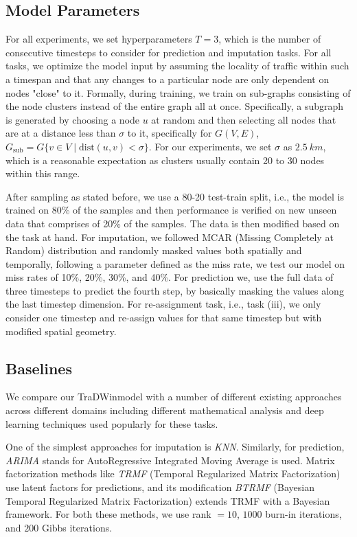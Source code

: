 \documentclass[conference]{IEEEtran}
\newcommand{\name}{TraDWin}
\begin{document}
\subsection{Model Parameters}

For all experiments, we set hyperparameters $T = 3$, which is the number of consecutive timesteps to consider for prediction and imputation tasks. For all tasks, we optimize the model input by assuming the locality of traffic within such a timespan and that any changes to a particular node are only dependent on nodes "close" to it. Formally, during training, we train on sub-graphs consisting of the node clusters instead of the entire graph all at once. Specifically, a subgraph is generated by choosing a node $u$ at random and then selecting all nodes that are at a distance less than $\sigma$ to it, specifically for $G(V,E)$, $G_{\text{sub}} = G\{v \in V \; | \; \text{dist}(u, v) < \sigma\}$. For our experiments, we set $\sigma$ as $2.5\ km$, which is a reasonable expectation as clusters usually contain 20 to 30 nodes within this range.

After sampling as stated before, we use a 80-20 test-train split, i.e., the model is trained on 80\% of the samples and then performance is verified on new unseen data that comprises of 20\% of the samples. The data is then modified based on the task at hand. For imputation, we followed MCAR (Missing Completely at Random) distribution and randomly masked values both spatially and temporally, following a parameter defined as the miss rate, we test our model on miss rates of 10\%, 20\%, 30\%, and 40\%. For prediction we, use the full data of three timesteps to predict the fourth step, by basically masking the values along the last timestep dimension. For re-assignment task, i.e., task (iii), we only consider one timestep and re-assign values for that same timestep but with modified spatial geometry.

\subsection{Baselines}

We compare our \name model with a number of different existing approaches across different domains including different mathematical analysis and deep learning techniques used popularly for these tasks.

One of the simplest approaches for imputation is \textit{KNN}. Similarly, for prediction, \textit{ARIMA}\cite{arima} stands for AutoRegressive Integrated Moving Average is used. Matrix factorization methods like \textit{TRMF}\cite{trmf} (Temporal Regularized Matrix Factorization) use latent factors for predictions, and its modification \textit{BTRMF}\cite{btrmf} (Bayesian Temporal Regularized Matrix Factorization) extends TRMF with a Bayesian framework. For both these methods, we use rank $= 10$, $1000$ burn-in iterations, and $200$ Gibbs iterations.
\end{document}
